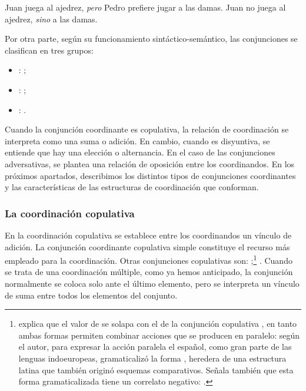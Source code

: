 \begin{exe}
  \ex\label{ex:12-binarias}
    \begin{xlist}
      \ex Juan juega al ajedrez, \textit{pero} Pedro prefiere jugar a las damas.
      \ex Juan no juega al ajedrez, \textit{sino} a las damas.
    \end{xlist}
\end{exe}

Por otra parte, según su funcionamiento sintáctico-semántico, las conjunciones se
clasifican en tres grupos:

\begin{itemize}
  \item {}: ;
  \item {}: ;
  \item {}: .
\end{itemize}

Cuando la conjunción coordinante es copulativa, la relación de coordinación se
interpreta como una suma o adición. En cambio, cuando es disyuntiva, se entiende
que hay una elección o alternancia. En el caso de las conjunciones adversativas,
se plantea una relación de oposición entre los coordinandos. En los próximos
apartados, describimos los distintos tipos de conjunciones coordinantes y las
características de las estructuras de coordinación que conforman.

\subsubsection{La coordinación copulativa}\label{sec:12-copulativa}

En la coordinación copulativa se establece entre los coordinandos un vínculo de
adición. La conjunción coordinante copulativa simple  constituye el
recurso más empleado para la coordinación. Otras conjunciones copulativas son:
;\footnote{\textcite[194]{jimenezjulia2023}
explica que el valor de  se solapa con el de la
conjunción copulativa , en tanto ambas formas permiten combinar acciones
que se producen en paralelo: según el autor, para expresar la acción paralela el
español, como gran parte de las lenguas indoeuropeas, gramaticalizó la forma
, heredera de una estructura latina que también originó
esquemas comparativos. Señala también que esta forma gramaticalizada tiene un
correlato negativo: .} . Cuando se trata de una
coordinación múltiple, como ya hemos anticipado, la conjunción 
normalmente se coloca solo ante el último elemento, pero se interpreta un
vínculo de suma entre todos los elementos del conjunto.

